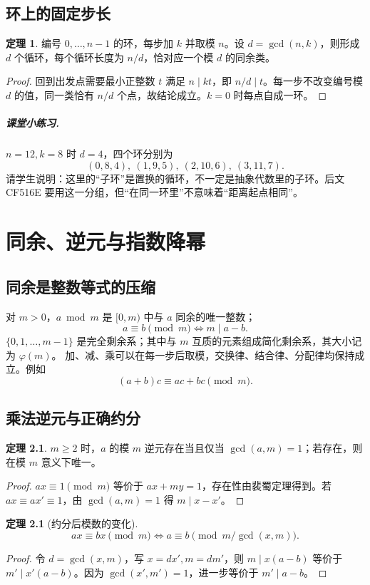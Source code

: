 \documentclass[UTF8,a4paper,11pt,oneside,openany,fontset=fandol]{ctexbook}
\theoremstyle{definition}
\newtheorem{theorem}[definition]{定理}
\begin{document}
\section{环上的固定步长}
\begin{theorem}
编号 $0,\ldots,n-1$ 的环，每步加 $k$ 并取模 $n$。设 $d=\gcd(n,k)$，则形成 $d$ 个循环，每个循环长度为 $n/d$，恰对应一个模 $d$ 的同余类。
\end{theorem}
\begin{proof}
回到出发点需要最小正整数 $t$ 满足 $n\mid kt$，即 $n/d\mid t$。每一步不改变编号模 $d$ 的值，同一类恰有 $n/d$ 个点，故结论成立。$k=0$ 时每点自成一环。
\end{proof}

\paragraph{课堂小练习.} $n=12,k=8$ 时 $d=4$，四个环分别为
\[
 (0,8,4),\ (1,9,5),\ (2,10,6),\ (3,11,7).
\]
请学生说明：这里的“子环”是置换的循环，不一定是抽象代数里的子环。后文 CF516E 要用这一分组，但“在同一环里”不意味着“距离起点相同”。



\chapter{同余、逆元与指数降幂}
\section{同余是整数等式的压缩}
对 $m>0$，$a\bmod m$ 是 $[0,m)$ 中与 $a$ 同余的唯一整数；
\[
 a\equiv b\pmod m\iff m\mid a-b.
\]
$\{0,1,\ldots,m-1\}$ 是完全剩余系；其中与 $m$ 互质的元素组成简化剩余系，其大小记为 $\varphi(m)$。
加、减、乘可以在每一步后取模，交换律、结合律、分配律均保持成立。例如
\[
 (a+b)c\equiv ac+bc\pmod m.
\]

\section{乘法逆元与正确约分}
\begin{theorem}
$m\ge2$ 时，$a$ 的模 $m$ 逆元存在当且仅当 $\gcd(a,m)=1$；若存在，则在模 $m$ 意义下唯一。
\end{theorem}
\begin{proof}
$ax\equiv1\pmod m$ 等价于 $ax+my=1$，存在性由裴蜀定理得到。若 $ax\equiv ax'\equiv1$，由 $\gcd(a,m)=1$ 得 $m\mid x-x'$。
\end{proof}
\begin{theorem}[约分后模数的变化]
\[
 ax\equiv bx\pmod m
 \iff a\equiv b\pmod{m/\gcd(x,m)}.
\]
\end{theorem}
\begin{proof}
令 $d=\gcd(x,m)$，写 $x=dx',m=dm'$，则 $m\mid x(a-b)$ 等价于 $m'\mid x'(a-b)$。因为 $\gcd(x',m')=1$，进一步等价于 $m'\mid a-b$。
\end{proof}
\end{document}
